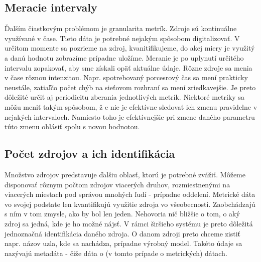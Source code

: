 \documentclass[printed,11pt,twoside,color,cover,table]{fithesis3}
\begin{document}
\subsection{Meracie intervaly}
Ďalším čiastkovým problémom je granularita metrík. Zdroje sú kontinuálne využívané v čase. Tieto dáta je potrebné nejakým spôsobom digitalizovať. V určitom momente sa pozrieme na zdroj, kvanitifikujeme, do akej miery je využitý a danú
hodnotu zobrazíme prípadne uložíme. Meranie je po uplynutí určitého intervalu zopakovať, aby sme získali opäť aktuálne údaje. Rôzne zdroje sa menia v čase rôznou intenzitou. Napr. spotrebovaný porcesrový čas
sa mení prakticky neustále, zatiaľčo počet chýb na sieťovom rozhraní sa mení zriedkavejšie. Je preto dôležité určiť aj periodicitu zberania jednotlivých metrík. Niektoré metriky sa môžu meniť takým spôsobom, ž
e nie je efektívne sledovať ich zmenu pravidelne v nejakých intervaloch. Namiesto toho je efektívnejšie pri zmene daného parametru túto zmenu ohlásiť spolu s novou hodnotou.

\subsection{Počet zdrojov a ich identifikácia}
Množstvo zdrojov predstavuje ďalšiu oblasť, ktorú je potrebné zvážiť. Môžeme disponovať rôznym počtom zdrojov viacerých druhov, rozmiestnenými na viacerých miestach pod správou mnohých ľudí - prípadne oddelení. Metrické dáta vo svojej
podstate len kvantifikujú využitie zdroja vo všeobecnosti. Zaobchádzajú s ním v tom zmysle, ako by bol len jeden. Nehovoria nič bližšie o tom, o aký zdroj sa jedná, kde je ho možné nájsť. V rámci širšieho
systému je preto dôležitá jednoznačná identifikácia daného zdroja. O danom zdroji preto chceme zistiť napr. názov uzla, kde sa nachádza, prípadne výrobný model. Takéto údaje sa nazývajú metadáta - čiže dáta o (v tomto 
prípade o metrických) dátach.
\end{document}
